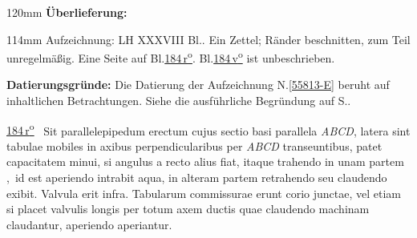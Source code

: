 %
\frenchspacing%
\begin{ledgroupsized}[r]{120mm}%
\footnotesize%
\pstart%
\noindent%
\textbf{Überlieferung:}%
\pend%
\end{ledgroupsized}%
\begin{ledgroupsized}[r]{114mm}%
\footnotesize%
\pstart%
\parindent -6mm%
%
Aufzeichnung:
LH XXXVIII Bl..
Ein Zettel;
Ränder beschnitten, zum Teil unregelmäßig.
Eine Seite auf Bl.\;\href{\Scan{LH_38_184r}}{184\,r\textsuperscript{o}}.
Bl.\;\href{\Scan{LH_38_184v}}{184\,v\textsuperscript{o}} ist unbeschrieben.
\pend%
\end{ledgroupsized}%
\vspace{5mm}%
\begin{ledgroup}%
\footnotesize%
\pstart%
\noindent%
\textbf{Datierungsgründe:}
Die Datierung der Aufzeichnung N.\;\ref{55813-E} beruht auf %
inhaltlichen Betrachtungen.
Siehe die ausführliche Begründung auf S.\;\pageref{55813-E_dat}.%
\pend%
\end{ledgroup}%
%
\frenchspacing%
\vspace{8mm}
\normalsize%
\pstart%
\noindent%
\lbrack%
\href{\Scan{LH_38_184r}}%
{184\,r\textsuperscript{o}}%
\rbrack\
Sit parallelepipedum erectum%
cujus sectio%
basi parallela \textit{ABCD},
latera sint tabulae mobiles%
in axibus perpendicularibus%
per \textit{ABCD} transeuntibus,
patet %
capacitatem%
minui,
si angulus a recto alius fiat,%
itaque trahendo in unam partem%
\lbrack,\rbrack\
id est aperiendo %
intrabit aqua,%
in alteram partem retrahendo
seu claudendo exibit.%
Valvula%
erit infra.
Tabularum commissurae%
%
erunt corio junctae,%
vel etiam si placet valvulis longis%
per totum axem ductis%
quae
claudendo machinam%
claudantur,
aperiendo
%
aperiantur.%
